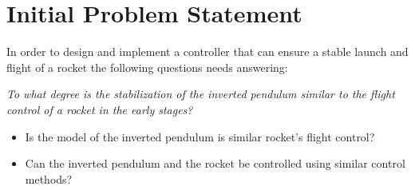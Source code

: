 \chapter{Initial Problem Statement}
In order to design and implement a controller that can ensure a stable launch and flight of a rocket the following questions needs answering: 

\textit{To what degree is the stabilization of the inverted pendulum similar to the flight control of a rocket in the early stages?}
\bigbreak
\begin{itemize}[noitemsep]
\item Is the model of the inverted pendulum is similar rocket's flight control?
\item Can the inverted pendulum and the rocket be controlled using similar control methods?
\end{itemize}



